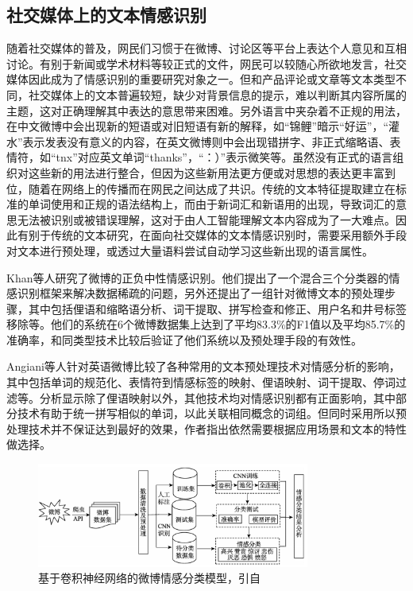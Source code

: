 \subsection{社交媒体上的文本情感识别}

随着社交媒体的普及，网民们习惯于在微博、讨论区等平台上表达个人意见和互相讨论。有别于新闻或学术材料等较正式的文件，网民可以较随心所欲地发言，社交媒体因此成为了情感识别的重要研究对象之一。但和产品评论或文章等文本类型不同，社交媒体上的文本普遍较短\cite{Madhusudhanan2018survey}，缺少对背景信息的提示，难以判断其内容所属的主题，这对正确理解其中表达的意思带来困难。另外语言中夹杂着不正规的用法，在中文微博中会出现新的短语或对旧短语有新的解释\cite{xie2012jiyu}，如“锦鲤”暗示“好运”，“灌水”表示发表没有意义的内容，在英文微博则中会出现错拼字、非正式缩略语、表情符\cite{go2009twitter}\cite{paltoglou2012twitter}，如“tnx”对应英文单词“thanks”，“：）”表示微笑等。虽然没有正式的语言组织对这些新的用法进行整合，但因为这些新用法更方便或对思想的表达更丰富到位，随着在网络上的传播而在网民之间达成了共识。传统的文本特征提取建立在标准的单词使用和正规的语法结构上，而由于新词汇和新语用的出现，导致词汇的意思无法被识别或被错误理解，这对于由人工智能理解文本内容成为了一大难点。因此有别于传统的文本研究，在面向社交媒体的文本情感识别时，需要采用额外手段对文本进行预处理，或透过大量语料尝试自动学习这些新出现的语言属性。

Khan等人\cite{khan2014tom}研究了微博的正负中性情感识别。他们提出了一个混合三个分类器的情感识别框架来解决数据稀疏的问题，另外还提出了一组针对微博文本的预处理步骤，其中包括俚语和缩略语分析、词干提取、拼写检查和修正、用户名和井号标签移除等。他们的系统在6个微博数据集上达到了平均83.3\%的F1值以及平均85.7\%的准确率，和同类型技术比较后验证了他们系统以及预处理手段的有效性。

Angiani等人\cite{angiani2016comparison}针对英语微博比较了各种常用的文本预处理技术对情感分析的影响，其中包括单词的规范化、表情符到情感标签的映射、俚语映射、词干提取、停词过滤等。分析显示除了俚语映射以外，其他技术均对情感识别都有正面影响，其中部分技术有助于统一拼写相似的单词，以此关联相同概念的词组。但同时采用所以预处理技术并不保证达到最好的效果，作者指出依然需要根据应用场景和文本的特性做选择。

\begin{figure}[H] %
  \centering
  \includegraphics[width=0.8\textwidth]{img/zhang2018jiyu.png}
  \caption{基于卷积神经网络的微博情感分类模型，引自\cite{zhang2018jiyu}}
  \label{fig:zhang2018jiyu}
\end{figure}

